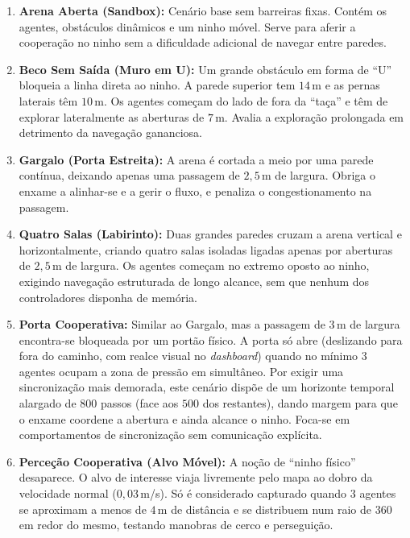 \documentclass[12pt,reqno, twoside]{amsbook}
\theoremstyle{plain}
\numberwithin{equation}{chapter}
\numberwithin{section}{chapter}
\numberwithin{table}{chapter}
\numberwithin{figure}{chapter}
\begin{document}
\begin{enumerate}
    \item \textbf{Arena Aberta (Sandbox):} Cenário base sem barreiras fixas. Contém os agentes, obstáculos dinâmicos e um ninho móvel. Serve para aferir a cooperação no ninho sem a dificuldade adicional de navegar entre paredes.
    
    \item \textbf{Beco Sem Saída (Muro em U):} Um grande obstáculo em forma de ``U'' bloqueia a linha direta ao ninho. A parede superior tem $14$\,m e as pernas laterais têm $10$\,m. Os agentes começam do lado de fora da ``taça'' e têm de explorar lateralmente as aberturas de $7$\,m. Avalia a exploração prolongada em detrimento da navegação gananciosa.

    \item \textbf{Gargalo (Porta Estreita):} A arena é cortada a meio por uma parede contínua, deixando apenas uma passagem de $2{,}5$\,m de largura. Obriga o enxame a alinhar-se e a gerir o fluxo, e penaliza o congestionamento na passagem.

    \item \textbf{Quatro Salas (Labirinto):} Duas grandes paredes cruzam a arena vertical e horizontalmente, criando quatro salas isoladas ligadas apenas por aberturas de $2{,}5$\,m de largura. Os agentes começam no extremo oposto ao ninho, exigindo navegação estruturada de longo alcance, sem que nenhum dos controladores disponha de memória.

    \item \textbf{Porta Cooperativa:} Similar ao Gargalo, mas a passagem de $3$\,m de largura encontra-se bloqueada por um portão físico. A porta só abre (deslizando para fora do caminho, com realce visual no \textit{dashboard}) quando no mínimo 3 agentes ocupam a zona de pressão em simultâneo. Por exigir uma sincronização mais demorada, este cenário dispõe de um horizonte temporal alargado de $800$ passos (face aos $500$ dos restantes), dando margem para que o enxame coordene a abertura e ainda alcance o ninho. Foca-se em comportamentos de sincronização sem comunicação explícita.

    \item \textbf{Perceção Cooperativa (Alvo Móvel):} A noção de ``ninho físico'' desaparece. O alvo de interesse viaja livremente pelo mapa ao dobro da velocidade normal ($0{,}03$\,m/s). Só é considerado capturado quando $3$ agentes se aproximam a menos de $4$\,m de distância e se distribuem num raio de 360\textdegree{} em redor do mesmo, testando manobras de cerco e perseguição.


\end{enumerate}
\end{document}
